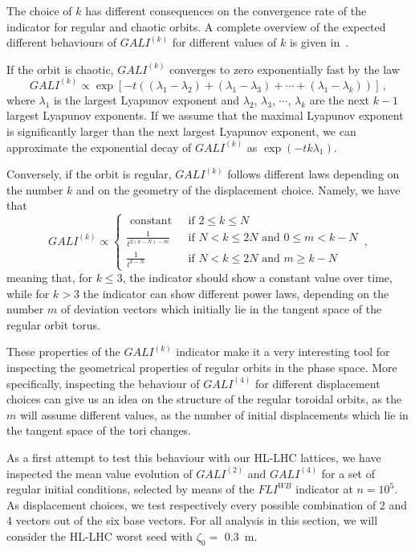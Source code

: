 The choice of $k$ has different consequences on the convergence rate of the indicator for regular and chaotic orbits. A complete overview of the expected different behaviours of $GALI^{(k)}$ for different values of $k$ is given in~\cite{SKOKOS200730}.

If the orbit is chaotic, $GALI^{(k)}$ converges to zero exponentially fast by the law
\begin{equation}
    GALI^{(k)} \propto \exp\left[-t\left((\lambda_1 - \lambda_2)+(\lambda_1 - \lambda_3)+\cdots+(\lambda_1 - \lambda_k)\right)\right] \,,
\end{equation}
where $\lambda_1$ is the largest Lyapunov exponent and $\lambda_2$, $\lambda_3$, $\cdots$, $\lambda_k$ are the next $k-1$ largest Lyapunov exponents. If we assume that the maximal Lyapunov exponent is significantly larger than the next largest Lyapunov exponent, we can approximate the exponential decay of $GALI^{(k)}$ as $\exp(-tk\lambda_1)$.

Conversely, if the orbit is regular, $GALI^{(k)}$ follows different laws depending on the number $k$ and on the geometry of the displacement choice. Namely, we have that
\begin{equation}
    GALI^{(k)} \propto \begin{cases}\text { constant } & \text { if } 2 \leq k \leq N \\ \frac{1}{t^{2(k-N)-m}} & \text { if } N<k \leq 2 N \text { and } 0 \leq m<k-N \\ \frac{1}{t^{k-N}} & \text { if } N<k \leq 2 N \text { and } m \geq k-N\end{cases} \,,
\end{equation}
meaning that, for $k\leq3$, the indicator should show a constant value over time, while for $k>3$ the indicator can show different power laws, depending on the number $m$ of deviation vectors which initially lie in the tangent space of the regular orbit torus.

These properties of the $GALI^{(k)}$ indicator make it a very interesting tool for inspecting the geometrical properties of regular orbits in the phase space. More specifically, inspecting the behaviour of $GALI^{(4)}$ for different displacement choices can give us an idea on the structure of the regular toroidal orbits, as the $m$ will assume different values, as the number of initial displacements which lie in the tangent space of the tori changes.

As a first attempt to test this behaviour with our HL-LHC lattices, we have inspected the mean value evolution of $GALI^{(2)}$ and $GALI^{(4)}$ for a set of regular initial conditions, selected by means of the $FLI^{WB}$ indicator at $n=10^5$. As displacement choices, we test respectively every possible combination of 2 and 4 vectors out of the six base vectors. For all analysis in this section, we will consider the HL-LHC worst seed with $\zeta_0=$ \SI{0.3}{\metre}.

